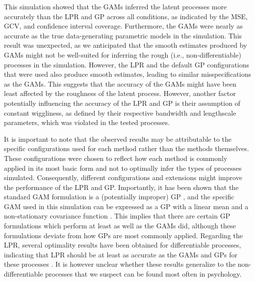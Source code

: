 \documentclass[man, floatsintext]{apa7}
\begin{document}
This simulation showed that the GAMs inferred the latent processes more
accurately than the LPR and GP across all conditions, as indicated by the MSE,
GCV, and confidence interval coverage. Furthermore, the GAMs were nearly as
accurate as the true data-generating parametric models in the simulation. This
result was unexpected, as we anticipated that the smooth estimates produced by
GAMs might not be well-suited for inferring the rough (i.e.,
non-differentiable) processes in the simulation. However, the LPR and the
default GP configurations that were used also produce smooth estimates, leading
to similar misspecifications as the GAMs. This suggests that the accuracy of
the GAMs might have been least affected by the roughness of the latent process.
However, another factor potentially influencing the accuracy of the LPR and GP
is their assumption of constant wiggliness, as defined by their respective
bandwidth and lengthscale parameters, which was violated in the tested
processes.

It is important to note that the observed results may be attributable to the
specific configurations used for each method rather than the methods
themselves. These configurations were chosen to reflect how each method is
commonly applied in its most basic form and not to optimally infer the types of
processes simulated. Consequently, different configurations and extensions
might improve the performance of the LPR and GP\@. Importantly, it has been
shown that the standard GAM formulation is a (potentially improper) GP
\parencite{wahba_improper_1978}, and the specific GAM used in this simulation
can be expressed as a GP with a linear mean and a non-stationary covariance
function \parencite{rasmussen_gaussian_2006}. This implies that there are
certain GP formulations which perform at least as well as the GAMs did,
although these formulations deviate from how GPs are most commonly applied.
Regarding the LPR, several optimality results have been obtained for
differentiable processes, indicating that LPR should be at least as accurate as
the GAMs and GPs for these processes \parencite{fan_local_1997}. It is however
unclear whether these results generalize to the non-differentiable processes
that we suspect can be found most often in psychology.
\end{document}
